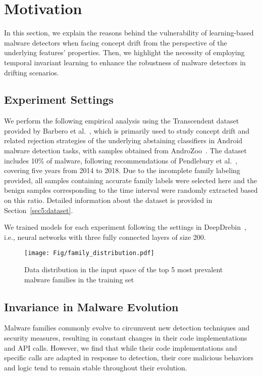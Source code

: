 \section{Motivation}

In this section, we explain the reasons behind the vulnerability of learning-based malware detectors when facing concept drift from the perspective of the underlying features' properties. Then, we highlight the necessity of employing temporal invariant learning to enhance the robustness of malware detectors in drifting scenarios. 

\subsection{Experiment Settings}

We perform the following empirical analysis using the Transcendent dataset provided by Barbero et al.~\cite{transcending}, which is primarily used to study concept drift and related rejection strategies of the underlying abstaining classifiers in Android malware detection tasks, with samples obtained from AndroZoo~\cite{androzoo}. The dataset includes 10\% of malware, following recommendations of Pendlebury et al.~\cite{tesseract}, covering five years from 2014 to 2018. Due to the incomplete family labeling provided, all samples containing accurate family labels were selected here and the benign samples corresponding to the time interval were randomly extracted based on this ratio. Detailed information about the dataset is provided in Section~\ref{sec5:dataset}. 

We trained models for each experiment following the settings in DeepDrebin~\cite{deepdrebin}, i.e., neural networks with three fully connected layers of size 200.

\begin{figure*}
    \centering
    \setlength{\abovecaptionskip}{0.cm}
    \texttt{[image: Fig/family\_distribution.pdf]}
    \caption{Data distribution in the input space of the top 5 most prevalent malware families in the training set}
    \label{fig:family_distribution}
\end{figure*}

\subsection{Invariance in Malware Evolution}
Malware families commonly evolve to circumvent new detection techniques and security measures, resulting in constant changes in their code implementations and API calls. However, we find that while their code implementations and specific calls are adapted in response to detection, their core malicious behaviors and logic tend to remain stable throughout their evolution.

